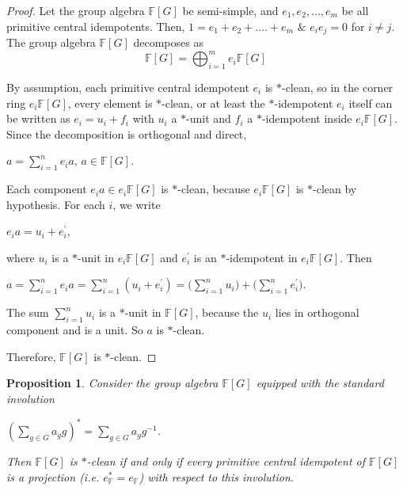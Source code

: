 \documentclass[12pt, reqno]{amsart}
\numberwithin{equation}{section}
\theoremstyle{definition}
\theoremstyle{remark}
\theoremstyle{plain}
\newtheorem{proposition}[definition]{Proposition}
\begin{document}
\begin{proof}
Let the group algebra $\mathbb{F}[G]$ be semi-simple, and $e_1, e_2, ..., e_m$ be all primitive central idempotents. Then, $1=e_1+e_2+....+e_m$ $\&$ $e_{i}e_{j}=0$ for $i\neq j$. The group algebra $\mathbb{F}[G]$ decomposes as
\begin{equation}
\mathbb{F}[G]=\bigoplus_{i=1}^{m}e_i\mathbb{F}[G]\nonumber
\end{equation}\smallskip

By assumption, each primitive central idempotent $e_i$ is $*$-clean, so in the corner ring $e_i\mathbb{F}[G]$, every element is $*$-clean, or at least the $*$-idempotent $e_i$ itself can be written as $e_i=u_i+f_i$ with $u_i$ a $*$-unit and $f_i$ a $*$-idempotent inside $e_i\mathbb{F}[G]$. Since the decomposition is orthogonal and direct,\smallskip
\begin{center}
  $a=\sum_{i=1}^{n}e_ia$,         $a\in\mathbb{F}[G]$.
\end{center}\smallskip

Each component $e_ia\in e_i\mathbb{F}[G]$ is $*$-clean, because $e_i\mathbb{F}[G]$ is $*$-clean by hypothesis. For each $i$, we write\smallskip
\begin{center}
  $e_ia=u_i+e^{'}_{i}$,
\end{center}\smallskip

where $u_i$ is a $*$-unit in $e_i\mathbb{F}[G]$ and $e^{'}_{i}$ is an $*$-idempotent in $e_i\mathbb{F}[G]$. Then\smallskip
\begin{center}
 $a=\sum_{i=1}^{n}e_ia=\sum_{i=1}^{n}(u_i+e^{'}_{i})=\bigg(\sum_{i=1}^{n}u_i\bigg)+\bigg(\sum_{i=1}^{n}e^{'}_{i}\bigg)$. 
\end{center}\smallskip

The sum $\sum_{i=1}^{n}u_i$ is a $*$-unit in $\mathbb{F}[G]$, because the $u_i$ lies in orthogonal component and is a unit. So $a$ is $*$-clean.\smallskip

Therefore, $\mathbb{F}[G]$ is $*$-clean. 
\end{proof}
\begin{proposition}
Consider the group algebra $\mathbb{F}[G]$ equipped with the standard involution 
\begin{center}
$(\sum_{g\in G}a_gg)^*=\sum_{g\in G}a_gg^{-1}$. 
\end{center}
Then $\mathbb{F}[G]$ is $*$-clean if and only if every primitive central idempotent of $\mathbb{F}[G]$ is a projection (i.e. $e_\mathbb{F}^{*}=e_\mathbb{F}$) with respect to this involution. 
\end{proposition}
 
\end{document}
